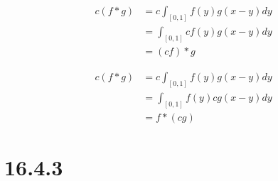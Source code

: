 \documentclass{article}
\begin{document}
\begin{itemize}
        \begin{align*}
          c(f \ast g)
           & = c \int_{[0, 1]} f(y) g(x - y) dy \\
           & = \int_{[0, 1]} cf(y) g(x - y) dy  \\
           & = (cf) \ast g
        \end{align*}

        \begin{align*}
          c(f \ast g)
           & = c \int_{[0, 1]} f(y) g(x - y) dy \\
           & = \int_{[0, 1]} f(y) cg(x - y) dy  \\
           & = f \ast (cg)
        \end{align*}
\end{itemize}

\section*{16.4.3}
\end{document}
